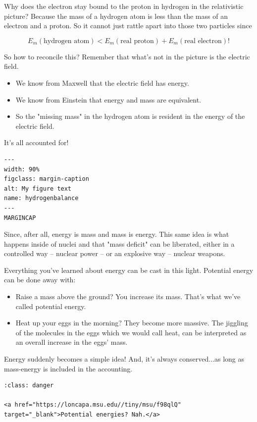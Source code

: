 \documentclass[
]{article}
\begin{document}
Why does the electron stay bound to the proton in hydrogen in the
relativistic picture? Because the mass of a hydrogen atom is less than
the mass of an electron and a proton. So it cannot just rattle apart
into those two particles since

\[E_m(\text{hydrogen atom}) < E_m(\text{real proton}) + E_m(\text{real electron})! \nonumber\]

So how to reconcile this? Remember that what's not in the picture is the
electric field.

\begin{itemize}
\item
  We know from Maxwell that the electric field has energy.
\item
  We know from Einstein that energy and mass are equivalent.
\item
  So the "missing mass" in the hydrogen atom is resident in the energy
  of the electric field.
\end{itemize}

It's all accounted for!

\begin{verbatim}
---
width: 90%
figclass: margin-caption
alt: My figure text
name: hydrogenbalance
---
MARGINCAP
\end{verbatim}

Since, after all, energy is mass and mass is energy. This same idea is
what happens inside of nuclei and that "mass deficit" can be liberated,
either in a controlled way -- nuclear power -- or an explosive way --
nuclear weapons.

Everything you've learned about energy can be cast in this light.
Potential energy can be done away with:

\begin{itemize}
\item
  Raise a mass above the ground? You increase its mass. That's what
  we've called potential energy.
\item
  Heat up your eggs in the morning? They become more massive. The
  jiggling of the molecules in the eggs which we would call heat, can be
  interpreted as an overall increase in the eggs' mass.
\end{itemize}

Energy suddenly becomes a simple idea! And, it's always conserved...as
long as mass-energy is included in the accounting.

\begin{verbatim}
:class: danger

<a href="https://loncapa.msu.edu//tiny/msu/f98qlQ"  target="_blank">Potential energies? Nah.</a>
\end{verbatim}
\end{document}
